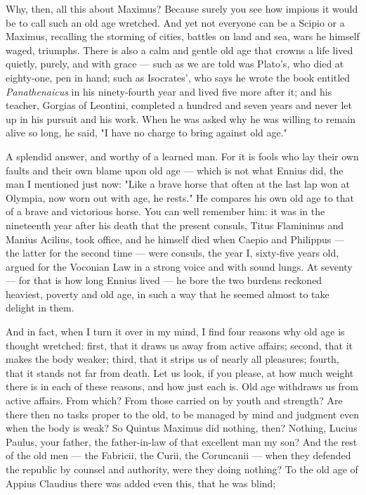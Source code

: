  Why, then, all this about Maximus? Because surely you see how impious it would be to call such an old age wretched. And yet not everyone can be a Scipio or a Maximus, recalling the storming of cities, battles on land and sea, wars he himself waged, triumphs. There is also a calm and gentle old age that crowns a life lived quietly, purely, and with grace — such as we are told was Plato's, who died at eighty-one, pen in hand; such as Isocrates', who says he wrote the book entitled \textit{Panathenaicus} in his ninety-fourth year and lived five more after it; and his teacher, Gorgias of Leontini, completed a hundred and seven years and never let up in his pursuit and his work. When he was asked why he was willing to remain alive so long, he said, "I have no charge to bring against old age."

 A splendid answer, and worthy of a learned man. For it is fools who lay their own faults and their own blame upon old age — which is not what Ennius did, the man I mentioned just now: "Like a brave horse that often at the last lap won at Olympia, now worn out with age, he rests." He compares his own old age to that of a brave and victorious horse. You can well remember him: it was in the nineteenth year after his death that the present consuls, Titus Flamininus and Manius Acilius, took office, and he himself died when Caepio and Philippus — the latter for the second time — were consuls, the year I, sixty-five years old, argued for the Voconian Law in a strong voice and with sound lungs. At seventy — for that is how long Ennius lived — he bore the two burdens reckoned heaviest, poverty and old age, in such a way that he seemed almost to take delight in them.

 And in fact, when I turn it over in my mind, I find four reasons why old age is thought wretched: first, that it draws us away from active affairs; second, that it makes the body weaker; third, that it strips us of nearly all pleasures; fourth, that it stands not far from death. Let us look, if you please, at how much weight there is in each of these reasons, and how just each is. Old age withdraws us from active affairs. From which? From those carried on by youth and strength? Are there then no tasks proper to the old, to be managed by mind and judgment even when the body is weak? So Quintus Maximus did nothing, then? Nothing, Lucius Paulus, your father, the father-in-law of that excellent man my son? And the rest of the old men — the Fabricii, the Curii, the Coruncanii — when they defended the republic by counsel and authority, were they doing nothing? To the old age of Appius Claudius there was added even this, that he was blind;

